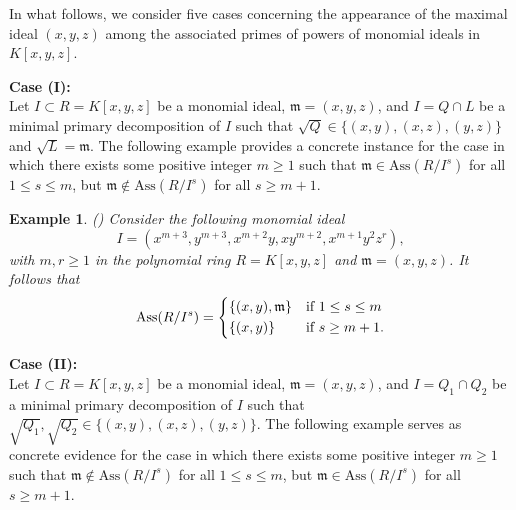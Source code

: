 \documentclass[11pt]{amsart}
\newtheorem{example}[theorem]{Example}
\begin{document}
In what follows, we consider five cases concerning the appearance of the
maximal ideal \((x,y,z)\) among the associated primes of powers of monomial
ideals in \(K[x,y,z]\).
 
 \medskip
\noindent\textbf{Case (I):} \\
Let $I\subset R=K[x,y,z]$ be a monomial ideal, $\mathfrak{m}=(x,y,z)$, and $I=Q \cap L$ be a minimal primary decomposition of $I$ such that $\sqrt{Q} \in \{(x,y), (x,z), (y,z)\}$ and $\sqrt{L}=\mathfrak{m}$. The following example provides a concrete instance for the case 
in which there exists some positive integer $m\geq 1$ such that  $\mathfrak{m}\in \mathrm{Ass}(R/I^s)$ for all $1\leq s \leq m$,   but  
 $\mathfrak{m}\notin \mathrm{Ass}(R/I^s)$ for all $s \geq m+1$. 


 \medskip
\begin{example} \label{Ex.Ass.PandN}(\cite[Example 1]{NT1})
\em{
Consider the following monomial ideal $$I=(x^{m+3}, y^{m+3}, x^{m+2}y, xy^{m+2}, x^{m+1}y^{2}z^r),$$
 with $m, r\geq 1$ in the polynomial ring   $R=K[x,y,z]$ and  $\mathfrak{m}=(x,y,z)$.  
 It follows that 
\[
\mathrm{Ass}(R/I^s) =
    \begin{dcases}
    \{(x,y), \mathfrak{m}\} & \text{if } 1\leq s\leq m\\
\{(x,y)\}  & \text{if } s\geq m+1. \\
                \end{dcases}
\]
}
\end{example}




\medskip
\noindent\textbf{Case (II):}\\
Let $I\subset R=K[x,y,z]$ be a monomial ideal, $\mathfrak{m}=(x,y,z)$, and $I=Q_1 \cap Q_2$ be a minimal primary decomposition of $I$ such that 
$\sqrt{Q_1} , \sqrt{Q_2}\in \{(x,y), (x,z), (y,z)\}$.   The following  example serves as concrete evidence for the case in which there exists some 
positive integer $m\geq 1$ such that  $\mathfrak{m}\notin \mathrm{Ass}(R/I^s)$ for all $1\leq s \leq m$,   but  
 $\mathfrak{m}\in \mathrm{Ass}(R/I^s)$ for all $s \geq m+1$. 
\end{document}
